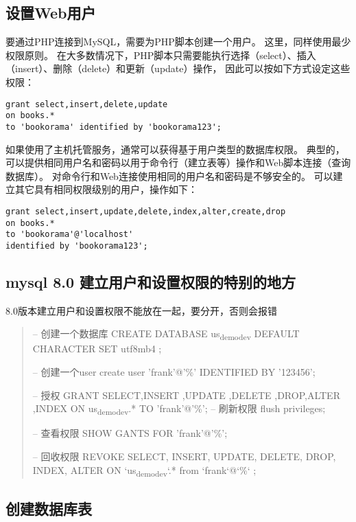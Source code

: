 \documentclass[11pt]{article}
\begin{document}
\subsection{设置Web用户}
\label{sec:orged56a9c}
要通过PHP连接到MySQL，需要为PHP脚本创建一个用户。 这里，同样使用最少权限原则。
在大多数情况下，PHP脚本只需要能执行选择（select）、插入（insert）、删除（delete）和更新（update）操作， 因此可以按如下方式设定这些权限：
\begin{verbatim}
grant select,insert,delete,update
on books.*
to 'bookorama' identified by 'bookorama123';
\end{verbatim}
如果使用了主机托管服务，通常可以获得基于用户类型的数据库权限。 典型的，可以提供相同用户名和密码以用于命令行（建立表等）操作和Web脚本连接（查询数据库）。 对命令行和Web连接使用相同的用户名和密码是不够安全的。 可以建立其它具有相同权限级别的用户，操作如下：
\begin{verbatim}
grant select,insert,update,delete,index,alter,create,drop
on books.*
to 'bookorama'@'localhost'
identified by 'bookorama123';
\end{verbatim}
\subsection{mysql 8.0 建立用户和设置权限的特别的地方}
\label{sec:orga1680d0}
8.0版本建立用户和设置权限不能放在一起，要分开，否则会报错
\begin{quote}
-- 创建一个数据库
CREATE DATABASE us\textsubscript{demo}\textsubscript{dev} DEFAULT CHARACTER SET utf8mb4 ;

-- 创建一个user
create user 'frank'@'\%' IDENTIFIED BY '123456';

-- 授权 
GRANT  SELECT,INSERT ,UPDATE ,DELETE ,DROP,ALTER ,INDEX  ON  us\textsubscript{demo}\textsubscript{dev}.*  TO  'frank'@'\%';
-- 刷新权限
flush privileges;

-- 查看权限
SHOW GANTS FOR 'frank'@'\%';

-- 回收权限 
REVOKE SELECT, INSERT, UPDATE, DELETE, DROP, INDEX, ALTER  ON `us\textsubscript{demo}\textsubscript{dev}`.* from `frank`@`\%` ;
\end{quote}
\subsection{创建数据库表}
\label{sec:org72d1b09}
\end{document}

